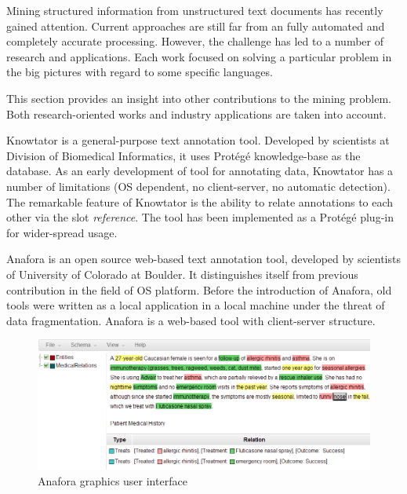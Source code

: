 
Mining structured information from unstructured text documents has recently gained attention.
Current approaches are still far from an fully automated and completely accurate processing.
However, the challenge has led to a number of research and applications.
Each work focused on solving a particular problem in the big pictures with regard to some specific languages. 

This section provides an insight into other contributions to the mining problem.
Both research-oriented works and industry applications are taken into account.

Knowtator is a general-purpose text annotation tool.
Developed by scientists at Division of Biomedical Informatics, 
it uses Protégé knowledge-base as the database.
As an early development of tool for annotating data, Knowtator has a number of limitations (OS dependent, no client-server, no automatic detection).
The remarkable feature of Knowtator is the ability to relate annotations to each other via the slot \textit{reference}.
The tool has been implemented as a Protégé plug-in for wider-spread usage.



Anafora is an open source web-based text annotation tool,
developed by scientists of University of Colorado at Boulder.
It distinguishes itself from previous contribution in the field of OS platform.
Before the introduction of Anafora, old tools were written as a local application in a local machine under the threat of data fragmentation.
Anafora is a web-based tool with client-server structure. %

\begin{figure}[!htb]
	\centering
	\includegraphics[width=\textwidth]{Images/anafora}
	\caption{Anafora graphics user interface}
	\label{fig:First}
\end{figure}


